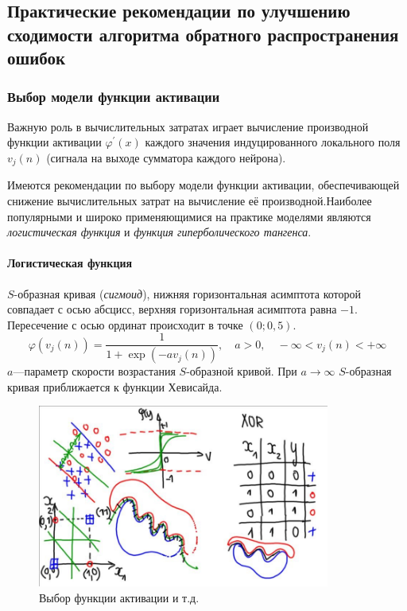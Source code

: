 \documentclass{article}
\numberwithin{equation}{subsection}
\begin{document}
\subsection{Практические рекомендации по улучшению сходимости алгоритма обратного распространения ошибок}




\subsubsection{Выбор модели функции активации}

Важную роль в вычислительных затратах играет вычисление производной функции активации
$\varphi^\prime (x)$ каждого значения индуцированного локального поля $v_j(n)$
(сигнала на выходе сумматора каждого нейрона).

Имеются рекомендации по выбору модели функции активации, обеспечивающей снижение
вычислительных затрат на вычисление её производной.Наиболее популярными и широко
применяющимися на практике моделями являются \textit{логистическая функция}
и \textit{функция гиперболического тангенса}.




\paragraph{Логистическая функция}

$S$-образная кривая (\textit{сигмоид}), нижняя горизонтальная асимптота которой 
совпадает с осью абсцисс, верхняя горизонтальная асимптота равна $-1$. 
Пересечение с осью ординат происходит в точке $(0; 0,5)$.
\begin{equation}
    \varphi (v_j(n)) = \dfrac{1}{1+\exp(-a v_j(n))},
    \quad a>0, \quad -\infty<v_j(n)<+\infty
\end{equation}
$a$---параметр скорости возрастания $S$-образной кривой. При $a\to\infty$ 
$S$-образная кривая приближается к функции Хевисайда.

\begin{figure}[htbp]
    \centering
    \includegraphics[height=6cm]{hyperflat_2_1.jpeg}
    \caption{Выбор функции активации и т.д.}
    \label{hyperflat_2_1}
\end{figure}
\end{document}
